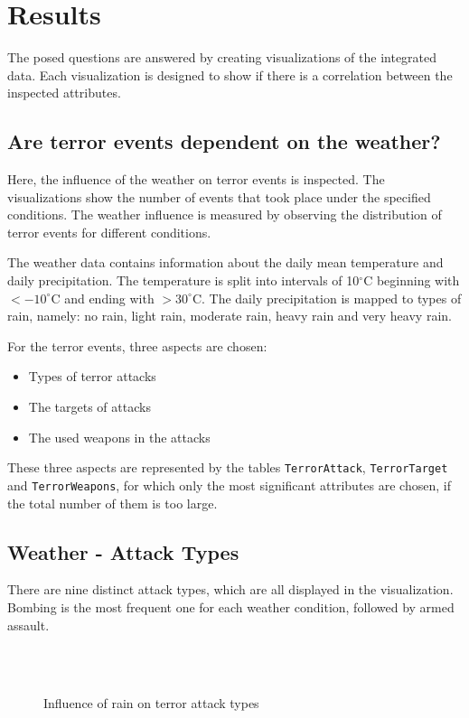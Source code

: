 \section{Results}
The posed questions are answered by creating visualizations of the integrated data. Each visualization is designed to show if there is a correlation between the inspected attributes.

\subsection{Are terror events dependent on the weather?}
Here, the influence of the weather on terror events is inspected. The visualizations show the number of events that took place under the specified conditions. The weather influence is measured by observing the distribution of terror events for different conditions.

The weather data contains information about the daily mean temperature and daily precipitation. The temperature is split into intervals of 10$^\circ$C beginning with $< -10^\circ$C and ending with $> 30^\circ$C. The daily precipitation is mapped to types of rain, namely: no rain, light rain, moderate rain, heavy rain and very heavy rain.

For the terror events, three aspects are chosen:
\begin{itemize}
	\item Types of terror attacks
	\item The targets of attacks
	\item The used weapons in the attacks
\end{itemize}

These three aspects are represented by the tables \texttt{TerrorAttack}, \texttt{TerrorTarget} and \texttt{TerrorWeapons}, for which only the most significant attributes are chosen, if the total number of them is too large.

\subsection{Weather - Attack Types}
There are nine distinct attack types, which are all displayed in the visualization. Bombing is the most frequent one for each weather condition, followed by armed assault.

\begin{figure}[!ht]
\centering
    \qquad\\
    \qquad
    \qquad\\
    \qquad
\caption{Influence of rain on terror attack types}
\end{figure}

